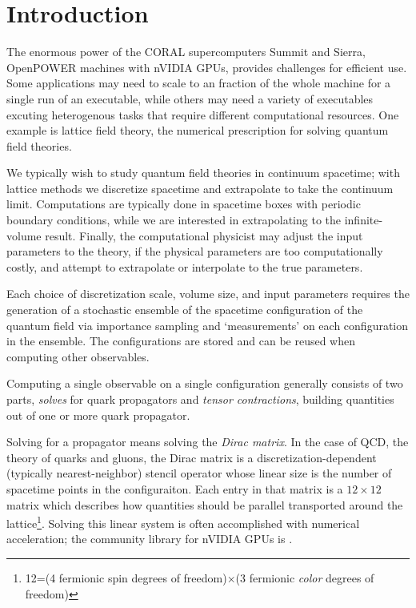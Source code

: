 \section{Introduction}

The enormous power of the CORAL supercomputers Summit and Sierra, OpenPOWER machines with nVIDIA GPUs, provides challenges for efficient use\cite{summit,sierra}.
Some applications may need to scale to an  fraction of the whole machine for a single run of an executable, while others may need a variety of executables excuting heterogenous tasks that require different computational resources.  One example is lattice field theory, the numerical prescription for solving quantum field theories.

We typically wish to study quantum field theories in continuum spacetime; with lattice methods we discretize spacetime and extrapolate to take the continuum limit.
Computations are typically done in spacetime boxes with periodic boundary conditions, while we are interested in extrapolating to the infinite-volume result.
Finally, the computational physicist may adjust the input parameters to the theory, if the physical parameters are too computationally costly, and attempt to extrapolate or interpolate to the true parameters.

Each choice of discretization scale, volume size, and input parameters requires the generation of a stochastic ensemble of the spacetime configuration of the quantum field via importance sampling and `measurements' on each configuration in the ensemble.
The configurations are stored and can be reused when computing other observables.

Computing a single observable on a single configuration generally consists of two parts, \emph{solves} for quark propagators and \emph{tensor contractions}, building quantities out of one or more quark propagator.

Solving for a propagator means solving the \emph{Dirac matrix}.
In the case of QCD, the theory of quarks and gluons, the Dirac matrix is a discretization-dependent (typically nearest-neighbor) stencil operator whose linear size is the number of spacetime points in the configuraiton.
Each entry in that matrix is a $12\times12$ matrix which describes how quantities should be parallel transported around the lattice\footnote{12=(4 fermionic spin degrees of freedom)$\times$(3 fermionic \emph{color} degrees of freedom)}.
Solving this linear system is often accomplished with numerical acceleration; the community library for nVIDIA GPUs is \quda\cite{Clark:2009wm,Babich:2011np}.

